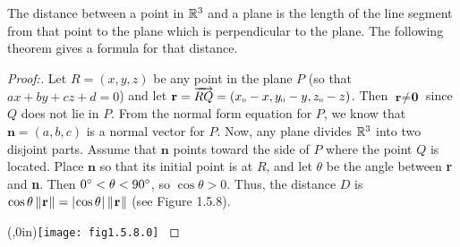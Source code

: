 The distance between a point in $\mathbb{R}^{3}$ and a plane is the length of the line segment from that point to the plane
which is perpendicular to the plane. 
The following theorem gives a formula for that distance.
\begin{proofbar}\vspace{-3mm}\begin{proof}[Proof:]
 \par\noindent Let $R = (x,y,z)$ be any point in the plane $P$ (so that $ax + by + cz + d = 0$)
 and let $\textbf{r} = \overrightarrow{RQ} =
 (x_{\scriptscriptstyle 0} - x,y_{\scriptscriptstyle 0} - y,z_{\scriptscriptstyle 0} - z)$. 
 Then $\textbf{r} \ne \textbf{0}$ since $Q$ does not lie in $P$.
 From the normal form equation for $P$, we know that $\textbf{n} = (a,b,c)$ is a normal vector for $P$. 
 Now, any plane
 divides $\mathbb{R}^{3}$ into two disjoint parts. Assume that $\textbf{n}$ points toward the side of $P$ where the point
 $Q$ is located. 
 Place $\textbf{n}$ so that its initial point is at $R$, and let $\theta$ be the angle between
 \textbf{r} and \textbf{n}. Then $0^\circ < \theta < 90^\circ$, so $\cos \theta > 0$. 
 Thus, the distance $D$ is
 $\cos \theta \,\lVert\mspace{1mu}\textbf{r}\mspace{1mu}\rVert = \lvert\mspace{1mu}\cos \theta\mspace{1mu}\rvert\,\lVert\mspace{1mu}\textbf{r}\mspace{1mu}\rVert$ (see Figure 1.5.8).

 \piccaption[]{}\parpic(\textwidth,0in){\texttt{[image: fig1.5.8.0]}
 \piccaptioninside}
 \par\mbox{}\newline\vspace{1mm}


\end{proof}
\end{proofbar}
